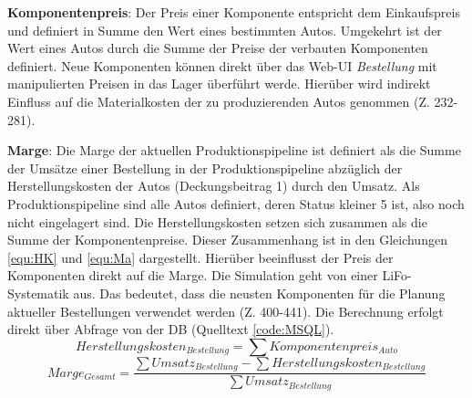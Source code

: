 \textbf{Komponentenpreis}: Der Preis einer Komponente entspricht dem Einkaufspreis und definiert in Summe den Wert eines bestimmten Autos. Umgekehrt ist der Wert eines Autos durch die Summe der Preise der verbauten Komponenten definiert. Neue Komponenten können direkt über das Web-UI \textit{Bestellung} mit manipulierten Preisen in das Lager überführt werde. Hierüber wird indirekt Einfluss auf die Materialkosten der zu produzierenden Autos genommen (Z. 232-281).

\textbf{Marge}: Die Marge der aktuellen Produktionspipeline ist definiert als die Summe der Umsätze einer Bestellung in der Produktionspipeline abzüglich der Herstellungskosten der Autos (Deckungsbeitrag 1) durch den Umsatz. Als Produktionspipeline sind alle Autos definiert, deren Status kleiner 5 ist, also noch nicht eingelagert sind. Die Herstellungskosten setzen sich zusammen als die Summe der Komponentenpreise. Dieser Zusammenhang ist in den Gleichungen \ref{equ:HK} und \ref{equ:Ma} dargestellt. Hierüber beeinflusst der Preis der Komponenten direkt auf die Marge. Die Simulation geht von einer \ac{LiFo}-Systematik aus. Das bedeutet, dass die neusten Komponenten für die Planung aktueller Bestellungen verwendet werden (Z. 400-441). Die Berechnung erfolgt direkt über Abfrage von der \ac{DB} (Quelltext \ref{code:MSQL}).
\begin{equation}\label{equ:HK}
    Herstellungskosten_{Bestellung} = \sum Komponentenpreis_{Auto}
\end{equation}
\begin{equation}\label{equ:Ma}
    Marge_{Gesamt} = \frac{\sum Umsatz_{Bestellung} - \sum Herstellungskosten_{Bestellung}}{\sum Umsatz_{Bestellung}}
\end{equation}
 \label{code:MSQL}

